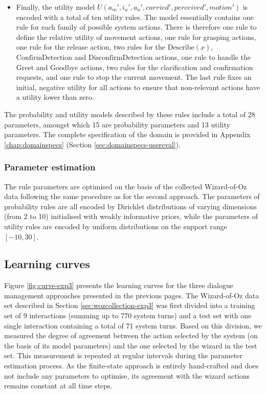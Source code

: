 \begin{itemize}
\item Finally, the utility model $U(a_m', i_u', a_u', \mathit{carried'}, \mathit{perceived'}, \mathit{motion'})$ is encoded with a total of ten utility rules.  The model essentially contains one rule for each family of possible system actions.  There is therefore one rule to define the relative utility of movement actions, one rule for grasping actions, one rule for the release action, two rules for the $\mathrm{Describe(\mathit{x})}$, $\mathrm{ConfirmDetection}$ and $\mathrm{DisconfirmDetection}$ actions, one rule to handle the  $\mathrm{Greet}$ and $\mathrm{Goodbye}$ actions, two rules for the clarification and confirmation requests, and one rule to stop the current movement. The last rule fixes an initial, negative utility for all actions to ensure that non-relevant actions have a utility lower than zero.  

\end{itemize}

The probability and utility models described by these rules include a total of 28 parameters, amongst which 15 are probability parameters and 13 utility parameters.  The complete specification of the domain is provided in Appendix \ref{chap:domainspecs} (Section \ref{sec:domainspecs-usereval}). 

\subsubsection*{Parameter estimation}

The rule parameters are optimised on the basis of the collected Wizard-of-Oz data following the same procedure as for the second approach.  The parameters of probability rules are all encoded by Dirichlet distributions of varying dimensions (from 2 to 10) initialised with weakly informative priors, while the parameters of utility rules are encoded by uniform distributions on the support range $[-10, 30]$.  


\subsection{Learning curves}
\label{sec:learningcurve-exp3}

Figure \ref{fig:curve-exp3} presents the learning curves for the three dialogue management approaches presented in the previous pages. The Wizard-of-Oz data set described in Section \ref{sec:wozcollection-exp3} was first divided into a training set of 9 interactions (summing up to 770 system turns) and a test set with one single interaction containing a total of 71 system turns. Based on this division, we measured the degree of agreement between the action selected by the system (on the basis of its model parameters) and the one selected by the wizard in the test set. This measurement is repeated at regular intervals during the parameter estimation process.  As the finite-state approach is entirely hand-crafted and does not include any parameters to optimise, its agreement with the wizard actions remains constant at all time steps. 

